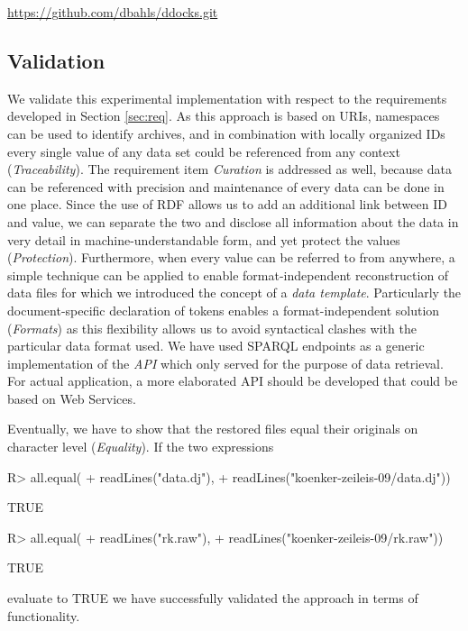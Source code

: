 \documentclass{acm_proc_article-sp}
\begin{document}
%
%
\url{https://github.com/dbahls/ddocks.git}




\subsection{Validation}


We validate this experimental implementation with respect to the requirements developed in Section \ref{sec:req}.
As this approach is based on URIs, namespaces can be used to identify archives, and in combination with locally organized IDs every single value of any data set could be referenced from any context (\textit{Traceability}).
The requirement item \textit{Curation} is addressed as well, because data can be referenced with precision and maintenance of every data can be done in one place. 
Since the use of RDF allows us to add an additional link between ID and value, we can separate the two and disclose all information about the data in very detail in machine-understandable form, and yet protect the values (\textit{Protection}).
Furthermore, when every value can be referred to from anywhere, a simple technique can be applied to enable format-independent reconstruction of data files for which we introduced the concept of a \textit{data template}.
Particularly the document-specific declaration of tokens enables a format-independent solution (\textit{Formats}) as this flexibility allows us to avoid syntactical clashes with the particular data format used.
We have used SPARQL endpoints as a generic implementation of the \textit{API} which only served for the purpose of data retrieval.
For actual application, a more elaborated API should be developed that could be based on Web Services.



Eventually, we have to show that the restored files equal their originals on character level (\textit{Equality}).
If the two expressions
\begin{Schunk}
\begin{Sinput}
R> all.equal(
+    readLines("data.dj"), 
+    readLines("koenker-zeileis-09/data.dj")) 
\end{Sinput}
\begin{Soutput}
[1] TRUE
\end{Soutput}
\begin{Sinput}
R> all.equal(
+    readLines("rk.raw"), 
+    readLines("koenker-zeileis-09/rk.raw")) 
\end{Sinput}
\begin{Soutput}
[1] TRUE
\end{Soutput}
\end{Schunk}
evaluate to TRUE we have successfully validated the approach in terms of functionality.
\end{document}
